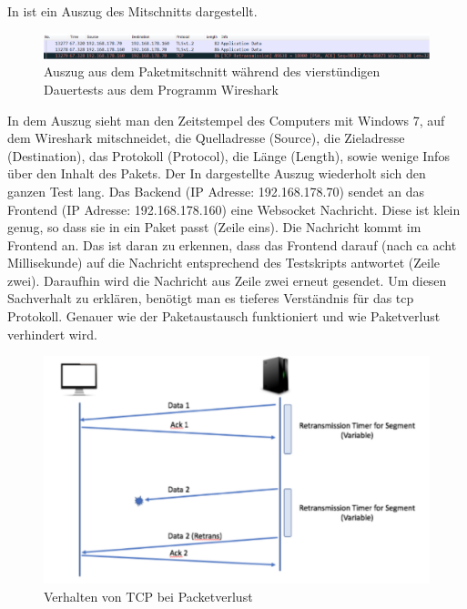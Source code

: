 In  ist ein Auszug des Mitschnitts dargestellt.
\begin{figure}[ht]
  \centering
  \includegraphics[width=\textwidth]{content/hauptteil/umsetzungPoC/pocTest/res/LatenzNormal4hWireshark.pdf}
  \caption{Auszug aus dem Paketmitschnitt während des vierstündigen Dauertests aus dem Programm \mbox{Wireshark} \citep{wireshark:program}}
  \label{fig:testing:latency4hNorm:wireshark}
\end{figure}
In dem Auszug sieht man den Zeitstempel des Computers mit Windows 7, auf dem Wireshark mitschneidet, die Quelladresse (Source), die Zieladresse (Destination), das Protokoll (Protocol), die Länge (Length), sowie wenige Infos über den Inhalt des Pakets.
Der In  dargestellte Auszug wiederholt sich den ganzen Test lang.
Das Backend (IP Adresse: 192.168.178.70) sendet an das Frontend (IP Adresse: 192.168.178.160) eine Websocket Nachricht. Diese ist klein genug, so dass sie in ein Paket passt (Zeile eins).
Die Nachricht kommt im Frontend an. Das ist daran zu erkennen, dass das Frontend darauf (nach ca acht Millisekunde) auf die Nachricht entsprechend des Testskripts antwortet (Zeile zwei).
Daraufhin wird die Nachricht aus Zeile zwei erneut gesendet.
Um diesen Sachverhalt zu erklären, benötigt man es tieferes Verständnis für das \ac{tcp} Protokoll. Genauer wie der Paketaustausch funktioniert und wie Paketverlust verhindert wird.
\begin{figure}[ht]
  \centering
  \includegraphics[width=\textwidth]{content/hauptteil/umsetzungPoC/pocTest/res/tcpPackageLostGraph.pdf}
  \caption{Verhalten von TCP bei Packetverlust \citep{tcp:articel}}
  \label{fig:testing:tcp:retrans}
\end{figure}
